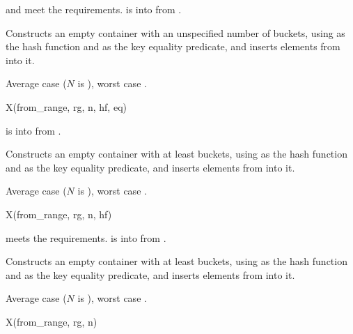 \begin{itemdescr}
\pnum
\expects
{} and  meet
the  requirements.
 is
 into  from .

\pnum
\effects
Constructs an empty container with an unspecified number of buckets,
using  as the hash function and
 as the key equality predicate, and
inserts elements from  into it.

\pnum
\complexity
Average case  ($N$ is ), worst case .
\end{itemdescr}

\begin{itemdecl}
X(from_range, rg, n, hf, eq)
\end{itemdecl}

\begin{itemdescr}
\pnum
\expects
{} is
 into 
from .

\pnum
\effects
Constructs an empty container with at least  buckets,
using  as the hash function and
 as the key equality predicate, and
inserts elements from  into it.

\pnum
\complexity
Average case  ($N$ is ),
worst case .
\end{itemdescr}

\begin{itemdecl}
X(from_range, rg, n, hf)
\end{itemdecl}

\begin{itemdescr}
\pnum
\expects
{} meets the  requirements.
 is
 into 
from .

\pnum
\effects
Constructs an empty container with at least  buckets,
using  as the hash function and
 as the key equality predicate, and
inserts elements from  into it.

\pnum
\complexity
Average case  ($N$ is ),
worst case .
\end{itemdescr}

\begin{itemdecl}
X(from_range, rg, n)
\end{itemdecl}

